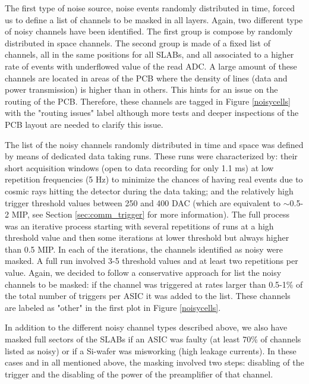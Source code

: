 \documentclass[final,3p,times,twocolumn]{elsarticle}
\begin{document}
The first type of noise source, noise events randomly distributed in time,
forced us to define a list of channels to be masked in all 
layers. Again, two different type of noisy channels have been identified. 
The first group is compose by randomly distributed in space channels.
The second group is made of
a fixed list of channels, all in the same positions for all SLABs,
and all associated to a higher rate of events with underflowed value
of the read ADC.
A large amount of these channels are located
in areas of the PCB where the density of lines 
(data and power transmission) is higher than in others.
This hints for an issue on the routing of the PCB.
Therefore, these channels are tagged in Figure \ref{noisycells} with the "routing issues" label
although more tests and deeper inspections of the PCB layout are needed to clarify this issue.

The list of the noisy channels randomly distributed in time and space was
defined by means of dedicated data taking runs. 
These runs were characterized by: their short acquisition windows (open to data recording for 
only 1.1 ms) at low repetition frequencies (5 Hz) to minimize the chances of having real events due to cosmic rays 
hitting the detector during the
data taking; and the relatively high trigger threshold values between 250 and 400 DAC 
(which are equivalent to $\sim$0.5-2 MIP, see Section \ref{sec:comm_trigger} for more 
information). The full process was an iterative process starting with several repetitions
of runs at a high threshold value and then some iterations at lower threshold but always 
higher than 0.5 MIP. 
In each of the iterations, the channels identified as noisy were masked.
A full run involved 3-5 threshold values and at least two repetitions per value.
Again, we decided to follow a conservative approach for list the noisy channels to be masked:
if the channel was triggered at rates larger than 0.5-1\% of the total number of triggers per ASIC
it was added to the list. These channels are labeled as "other" in the first plot in  Figure \ref{noisycells}.

In addition to the different noisy channel types described above, we also have
masked full sectors of the SLABs if an ASIC was faulty (at least 70\% of channels 
listed as noisy) or if a Si-wafer was misworking (high leakage currents). In these cases 
and in all mentioned above, the masking involved two steps: disabling of the trigger and 
the disabling of the power of the preamplifier of that channel.
\end{document}
